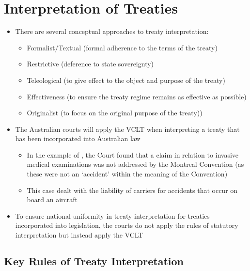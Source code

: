 \section{Interpretation of Treaties}
\begin{itemize}
    \item There are several conceptual approaches to treaty interpretation:
    \begin{itemize}
        \item Formalist/Textual (formal adherence to the terms of the treaty)
        \item Restrictive (deference to state sovereignty)
        \item Teleological (to give effect to the object and purpose of the treaty)
        \item Effectiveness (to ensure the treaty regime remains as effective as possible)
        \item Originalist (to focus on the original purpose of the treaty))
    \end{itemize}
    \item The Australian courts will apply the VCLT when interpreting a treaty that has been incorporated into Australian law
    \begin{itemize}
        \item In the example of , the Court found that a claim in relation to invasive medical examinations was not addressed by the Montreal Convention (as these were not an `accident' within the meaning of the Convention)
        \item This case dealt with the liability of carriers for accidents that occur on board an aircraft
    \end{itemize}
    \item To ensure national uniformity in treaty interpretation for treaties incorporated into legislation, the courts do not apply the rules of statutory interpretation but instead apply the VCLT
\end{itemize}

\subsection{Key Rules of Treaty Interpretation}

